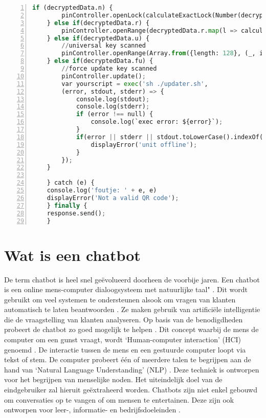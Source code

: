 \begin{lstlisting}[language=Python, caption={Openen van juiste locker of foutboodschap.}, label=lst:pythonPinController, numbers=left]
    if (decryptedData.n) {
        pinController.openLock(calculateExactLock(Number(decryptedData.n), Number(config.unit)));
    } else if(decryptedData.r) {
        pinController.openRange(decryptedData.r.map(l => calculateExactLock(Number(l), Number(config.unit))))
    } else if(decryptedData.u) {
        //universal key scanned
        pinController.openRange(Array.from({length: 128}, (_, i) => i + 1))
    } else if(decryptedData.fu) {
        //force update key scanned
        pinController.update();
        var yourscript = exec('sh ./updater.sh',
        (error, stdout, stderr) => {
            console.log(stdout);
            console.log(stderr);
            if (error !== null) {
                console.log(`exec error: ${error}`);
            }
            if(error || stderr || stdout.toLowerCase().indexOf('offline') > -1) {
                displayError('unit offline');
            }
        });
    }
    
    } catch (e) {
    console.log('foutje: ' + e, e)
    displayError('Not a valid QR code');
    } finally {
    response.send();
    }
\end{lstlisting}

\newpage


\section{Wat is een chatbot}%
\label{sec:chatbot}

De term chatbot is heel snel geëvolueerd doorheen de voorbije jaren. Een chatbot is een online mens-computer dialoogsysteem met natuurlijke taal" \autocite{Jia2003}. Dit wordt gebruikt om veel systemen te ondersteunen alsook om vragen van klanten automatisch te laten beantwoorden \autocite{Adamopoulou2020}. Ze maken gebruik van artificiële intelligentie die de vraagstelling van klanten analyseren. Op basis van de benodigdheden probeert de chatbot zo goed mogelijk te helpen \autocite{Khanna2015}. Dit concept waarbij de mens de computer om een gunst vraagt, wordt ‘Human-computer interaction’ (HCI) genoemd \autocite{Adamopoulou2020}. De interactie tussen de mens en een gestuurde computer loopt via tekst of stem. De computer probeert één of meerdere talen te begrijpen aan de hand van ‘Natural Language Understanding’ (NLP) \autocite{Khanna2015a}. Deze techniek is ontworpen voor het begrijpen van menselijke noden. Het uiteindelijk doel van de eindgebruiker zal hieruit geëxtraheerd worden.  Chatbots zijn niet enkel gebouwd om conversaties op te vangen of om mensen te entertainen. Deze zijn ook ontworpen voor leer-, informatie- en bedrijfsdoeleinden \autocite{Shawar2007}. 

